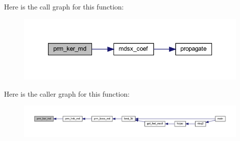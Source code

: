 Here is the call graph for this function\+:\nopagebreak
\begin{figure}[H]
\begin{center}
\leavevmode
\includegraphics[width=347pt]{Leroi_8f90_a54994b19439ad9ea5bfc96a902101c44_cgraph}
\end{center}
\end{figure}
Here is the caller graph for this function\+:\nopagebreak
\begin{figure}[H]
\begin{center}
\leavevmode
\includegraphics[width=350pt]{Leroi_8f90_a54994b19439ad9ea5bfc96a902101c44_icgraph}
\end{center}
\end{figure}
\mbox{\label{Leroi_8f90_a5a775b5fbe7ca4b27ec968d5efde2795}} 

